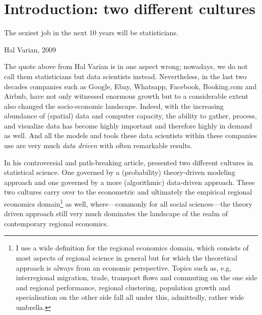 \documentclass[fleqn,10pt]{SelfArx} %
\affiliation{\textsuperscript{1}\textit{Department of Spatial Economics, Vrije Universiteit Amsterdam, Amsterdam, The Netherlands}} %
\affiliation{*\textbf{Corresponding author}: \Letter{} t.de.graaff@vu.n; \Mundus{} \href{thomasdegraaff.nl}{thomasdegraaff.nl}} %
\begin{document}
\flushbottom %
\maketitle %
\thispagestyle{empty} %


\section*{Introduction: two different cultures} %


\epigraph{The sexiest job in the next 10 years will be statisticians.}{Hal Varian, 2009}

The quote above from Hal Varian is in one aspect wrong; nowadays, we do not call
them statisticians but data scientists instead. Nevertheless, in the last two
decades companies such as Google, Ebay, Whatsapp, Facebook, Booking.com and
Airbnb, have not only witnessed enormous growth but to a considerable extent also changed the socio-economic landscape. Indeed, with the increasing abundance of (spatial) data and computer capacity, the ability to gather, process, and visualize data has become highly important and therefore highly in demand as well. And all the models and tools these data scientists within these companies use are very much \textit{data driven} with often remarkable results. 

In his controversial and path-breaking article, \citet{breiman2001statistical}
presented two different cultures in statistical science. One governed by
a (probability) theory-driven modeling approach and one governed by a more (algorithmic) data-driven approach. These two cultures carry over to the econometric and ultimately the
empirical regional economics domain\footnote{I use a wide definition for the regional economics
 domain, which consists of most aspects of regional science in general but for
 which the theoretical approach is always from an economic perspective. Topics
 such as, e.g, interregional migration, trade, transport flows and commuting on
 the one side and regional performance, regional clustering, population growth and
 specialisation on the other side fall all under this, admittedly, rather wide umbrella.} as well, where---commonly for all social
sciences---the theory driven approach still very much dominates the landscape of the realm of contemporary regional economics. 
\end{document}
